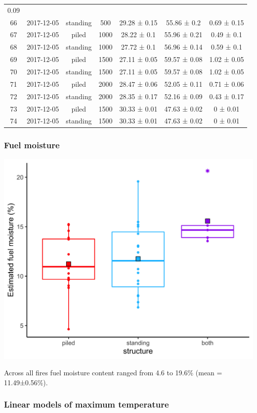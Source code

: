 \documentclass[11pt,a4paper]{article}
\begin{document}
\begin{longtable}[]{@{}ccccccc@{}}
0.09\tabularnewline
66 & 2017-12-05 & standing & 500 & 29.28 ± 0.15 & 55.86 ± 0.2 & 0.69 ±
0.15\tabularnewline
67 & 2017-12-05 & piled & 1000 & 28.22 ± 0.1 & 55.96 ± 0.21 & 0.49 ±
0.1\tabularnewline
68 & 2017-12-05 & standing & 1000 & 27.72 ± 0.1 & 56.96 ± 0.14 & 0.59 ±
0.1\tabularnewline
69 & 2017-12-05 & piled & 1500 & 27.11 ± 0.05 & 59.57 ± 0.08 & 1.02 ±
0.05\tabularnewline
70 & 2017-12-05 & standing & 1500 & 27.11 ± 0.05 & 59.57 ± 0.08 & 1.02 ±
0.05\tabularnewline
71 & 2017-12-05 & piled & 2000 & 28.47 ± 0.06 & 52.05 ± 0.11 & 0.71 ±
0.06\tabularnewline
72 & 2017-12-05 & standing & 2000 & 28.35 ± 0.17 & 52.16 ± 0.09 & 0.43 ±
0.17\tabularnewline
73 & 2017-12-05 & piled & 1500 & 30.33 ± 0.01 & 47.63 ± 0.02 & 0 ±
0.01\tabularnewline
74 & 2017-12-05 & standing & 1500 & 30.33 ± 0.01 & 47.63 ± 0.02 & 0 ±
0.01\tabularnewline
\bottomrule
\end{longtable}

\hypertarget{fuel-moisture}{%
\subsubsection{Fuel moisture}\label{fuel-moisture}}

\includegraphics{figures/fuel_moisture-1.png}

Across all fires fuel moisture content ranged from 4.6 to 19.6\% (mean =
11.49±0.56\%).

\hypertarget{linear-models-of-maximum-temperature}{%
\subsubsection{Linear models of maximum
temperature}\label{linear-models-of-maximum-temperature}}
\end{document}
